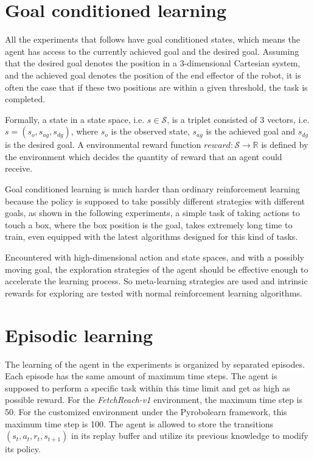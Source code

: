 \documentclass[a4paper, 12pt]{report}
\begin{document}
    \section {Goal conditioned learning}

    All the experiments that follows have goal conditioned states, which means the agent has access to the currently achieved goal and the desired goal. Assuming that the desired goal denotes the position in a 3-dimensional Cartesian system, and the achieved goal denotes the position of the end effector of the robot, it is often the case that if these two positions are within a given threshold, the task is completed. 

    Formally, a state in a state space, i.e. $s\in\mathcal S$, is a triplet consisted of 3 vectors, i.e. $s=(s_o, s_{ag}, s_{dg})$, where $s_o$ is the observed state, $s_{ag}$ is the achieved goal and $s_{dg}$ is the desired goal. A environmental reward function $reward: \mathcal S\to\mathbb R$ is defined by the environment which decides the quantity of reward that an agent could receive.

    Goal conditioned learning is much harder than ordinary reinforcement learning because the policy is supposed to take possibly different strategies with different goals, as shown in the following experiments, a simple task of taking actions to touch a box, where the box position is the goal, takes extremely long time to train, even equipped with the latest algorithms designed for this kind of tasks.

    Encountered with high-dimensional action and state spaces, and with a possibly moving goal, the exploration strategies of the agent should be effective enough to accelerate the learning process. So meta-learning strategies are used and intrinsic rewards for exploring are tested with normal reinforcement learning algorithms.
    
    \section {Episodic learning}
    
    The learning of the agent in the experiments is organized by separated episodes. Each episode has the same amount of maximum time steps. The agent is supposed to perform a specific task within this time limit and get as high as possible reward. For the \emph{FetchReach-v1} environment, the maximum time step is 50. For the customized environment under the Pyrobolearn framework, this maximum time step is 100. The agent is allowed to store the transitions $(s_t, a_t, r_t, s_{t+1})$ in its replay buffer and utilize its previous knowledge to modify its policy. 
\end{document}
